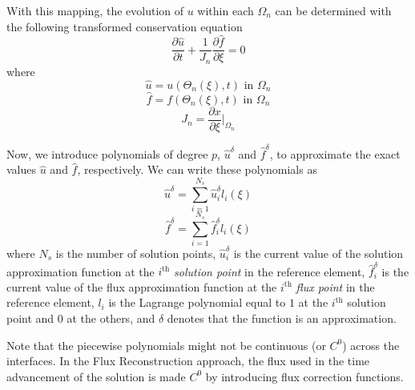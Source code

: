 With this mapping, the evolution of $u$ within each $\Omega_n$ can be determined with the following 
transformed conservation equation
\begin{equation}
\frac{\partial \hat{u}}{\partial t} + \frac{1}{J_n}\frac{\partial \hat{f}}{\partial \xi} = 0
\end{equation}
where
\begin{equation}
\hat{u} = u(\Theta_n(\xi),t) \text{ in } \Omega_n
\end{equation}
\begin{equation}
\hat{f} = f(\Theta_n(\xi),t) \text{ in } \Omega_n
\end{equation}
\begin{equation}
J_n = \frac{\partial x}{\partial \xi} \bigg|_{\Omega_n}
\end{equation}

Now, we introduce polynomials of degree $p$, $\hat{u}^\delta$ and $\hat{f}^\delta$, to approximate the exact values $\hat{u}$ and $\hat{f}$, respectively. We can write these polynomials as
\begin{equation}
\hat{u}^\delta = \sum_{i=1}^{N_s} \hat{u}_i^\delta l_i(\xi)
\end{equation}
\begin{equation}
\hat{f}^\delta = \sum_{i=1}^{N_s} \hat{f}_i^\delta l_i(\xi)
\end{equation}
where $N_s$ is the number of solution points, $\hat{u}_i^\delta$ is the current value of the 
solution approximation function at the $i^\text{th}$ \emph{solution point} in the reference element, 
$\hat{f}_i^\delta$ is the current value of the flux approximation function at the $i^\text{th}$ 
\emph{flux point} in the reference element, $l_i$ is the Lagrange polynomial equal to $1$ at the 
$i^\text{th}$ solution point and $0$ at the others, and $\delta$ denotes that the function is an 
approximation.

Note that the piecewise polynomials might not be continuous (or $C^0$) across the interfaces. In the 
Flux Reconstruction approach, the flux used in the time advancement of the solution is made $C^0$ 
by introducing flux correction functions.

